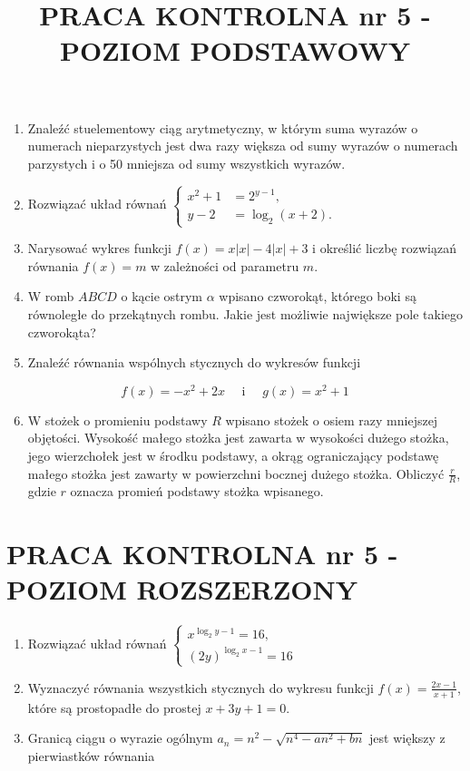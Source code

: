 \documentclass[10pt]{article}
\title{PRACA KONTROLNA nr 5 - POZIOM PODSTAWOWY }
\author{}
\date{}
\begin{document}
\maketitle
\begin{enumerate}
  \item Znaleźć stuelementowy ciąg arytmetyczny, w którym suma wyrazów o numerach nieparzystych jest dwa razy większa od sumy wyrazów o numerach parzystych i o 50 mniejsza od sumy wszystkich wyrazów.
  \item Rozwiązać układ równań $\left\{\begin{aligned} x^{2}+1 & =2^{y-1}, \\ y-2 & =\log _{2}(x+2) .\end{aligned}\right.$
  \item Narysować wykres funkcji $f(x)=x|x|-4|x|+3$ i określić liczbę rozwiązań równania $f(x)=m$ w zależności od parametru $m$.
  \item W romb $A B C D$ o kącie ostrym $\alpha$ wpisano czworokąt, którego boki są równoległe do przekątnych rombu. Jakie jest możliwie największe pole takiego czworokąta?
  \item Znaleźć równania wspólnych stycznych do wykresów funkcji
\end{enumerate}

$$
f(x)=-x^{2}+2 x \quad \text { i } \quad g(x)=x^{2}+1
$$

\begin{enumerate}
  \setcounter{enumi}{5}
  \item W stożek o promieniu podstawy $R$ wpisano stożek o osiem razy mniejszej objętości. Wysokość małego stożka jest zawarta w wysokości dużego stożka, jego wierzchołek jest w środku podstawy, a okrąg ograniczający podstawę małego stożka jest zawarty w powierzchni bocznej dużego stożka. Obliczyć $\frac{r}{R}$, gdzie $r$ oznacza promień podstawy stożka wpisanego.
\end{enumerate}

\section*{PRACA KONTROLNA nr 5 - POZIOM ROZSZERZONY}
\begin{enumerate}
  \item Rozwiązać układ równań $\left\{\begin{array}{c}x^{\log _{2} y-1}=16, \\ (2 y)^{\log _{2} x-1}=16\end{array}\right.$
  \item Wyznaczyć równania wszystkich stycznych do wykresu funkcji $f(x)=\frac{2 x-1}{x+1}$, które są prostopadłe do prostej $x+3 y+1=0$.
  \item Granicą ciągu o wyrazie ogólnym $a_{n}=n^{2}-\sqrt{n^{4}-a n^{2}+b n}$ jest większy z pierwiastków równania
\end{enumerate}
\end{document}
